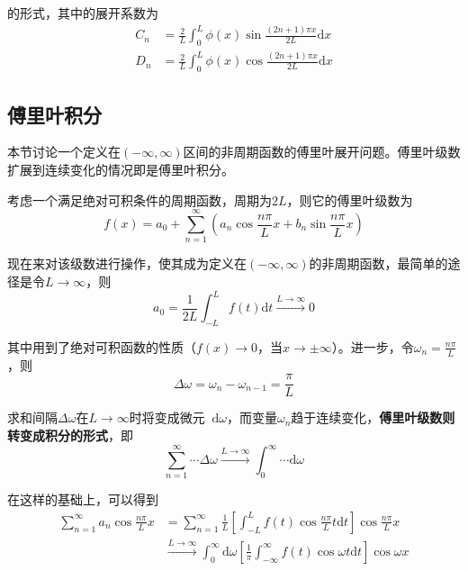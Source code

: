 \documentclass[UTF8,12pt]{ctexart}
\newcommand*{\dif}{\mathop{}\!\mathrm{d}}
\begin{document}
	\noindent 的形式，其中的展开系数为
	\begin{equation}
	\begin{aligned} C_{n} &=\frac{2}{L} \int_{0}^{L} \phi(x) \sin \frac{(2 n+1) \pi x}{2 L} \mathrm{d} x \\ D_{n} &=\frac{2}{L} \int_{0}^{L} \phi(x) \cos \frac{(2 n+1) \pi x}{2 L} \mathrm{d} x \end{aligned}
	\end{equation}
	
	\subsection{傅里叶积分}
	本节讨论一个定义在$ (-\infty,\infty) $区间的非周期函数的傅里叶展开问题。傅里叶级数扩展到连续变化的情况即是傅里叶积分。
	
	考虑一个满足绝对可积条件的周期函数，周期为$ 2L $，则它的傅里叶级数为
	\begin{equation}
	f(x)=a_{0}+\sum_{n=1}^{\infty}\left(a_{n} \cos \frac{n \pi}{L} x+b_{n} \sin \frac{n \pi}{L} x\right)\label{equ_sum}
	\end{equation}
	
	现在来对该级数进行操作，使其成为定义在$ (-\infty, \infty) $的非周期函数，最简单的途径是令$ L \rightarrow \infty $，则
	\begin{equation}
	a_{0}=\frac{1}{2 L} \int_{-L}^{L} f(t) \mathrm{d} t \stackrel{L \rightarrow \infty}{\longrightarrow} 0
	\end{equation}
	
\noindent 其中用到了绝对可积函数的性质（$ f(x) \rightarrow 0 $，当$ x \rightarrow \pm \infty $）。进一步，令$ \omega_{n} = \frac{n \pi}{L} $，则
\begin{equation}
\Delta \omega=\omega_{n}-\omega_{n-1}=\frac{\pi}{L}
\end{equation}

\noindent 求和间隔$ \Delta \omega $在$ L \rightarrow \infty $时将变成微元$ \dif \omega $，而变量$ \omega_{n} $趋于连续变化，\textbf{傅里叶级数则转变成积分的形式}，即
\begin{equation}
\sum_{n=1}^{\infty} \cdots \Delta \omega \stackrel{L \rightarrow \infty}{\longrightarrow} \int_{0}^{\infty} \cdots \mathrm{d} \omega
\end{equation}

	在这样的基础上，可以得到
	\begin{equation}
	\begin{aligned}
	\sum_{n=1}^{\infty} a_{n} \cos \frac{n \pi}{L} x&=\sum_{n=1}^{\infty} \frac{1}{L}\left[\int_{-L}^{L} f(t) \cos \frac{n \pi}{L} t \mathrm{d} t\right] \cos \frac{n \pi}{L} x\\
	&\stackrel{L \rightarrow \infty}{\longrightarrow} \int_{0}^{\infty} \mathrm{d} \omega\left[\frac{1}{\pi} \int_{-\infty}^{\infty} f(t) \cos \omega t \mathrm{d} t\right] \cos \omega x
	\end{aligned}
	\end{equation}
	
\end{document}
